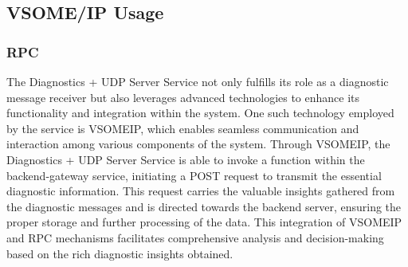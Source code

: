 \documentclass[
12pt,
oneside, 
onehalfspacing, 
nolistspacing, 
parskip, 
chapterinoneline, 
]{AASTCOMPUTER}
\begin{document}
\subsection{VSOME/IP Usage}
\subsubsection{RPC}
The Diagnostics + UDP Server Service not only fulfills its role as a diagnostic message receiver but also leverages advanced technologies to enhance its functionality and integration within the system. One such technology employed by the service is VSOMEIP, which enables seamless communication and interaction among various components of the system. Through VSOMEIP, the Diagnostics + UDP Server Service is able to invoke a function within the backend-gateway service, initiating a POST request to transmit the essential diagnostic information. This request carries the valuable insights gathered from the diagnostic messages and is directed towards the backend server, ensuring the proper storage and further processing of the data. This integration of VSOMEIP and RPC mechanisms facilitates comprehensive analysis and decision-making based on the rich diagnostic insights obtained.
\end{document}
